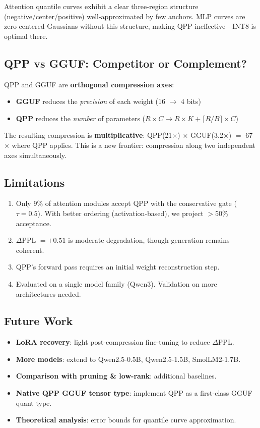 \documentclass[11pt,a4paper]{article}
\begin{document}
Attention quantile curves exhibit a clear three-region structure (negative/center/positive) well-approximated by few anchors. MLP curves are zero-centered Gaussians without this structure, making QPP ineffective---INT8 is optimal there.

\subsection{QPP vs GGUF: Competitor or Complement?}

QPP and GGUF are \textbf{orthogonal compression axes}:
\begin{itemize}
\item \textbf{GGUF} reduces the \textit{precision} of each weight (16 $\rightarrow$ 4 bits)
\item \textbf{QPP} reduces the \textit{number} of parameters ($R \times C \rightarrow R \times K + \lceil R/B \rceil \times C$)
\end{itemize}
The resulting compression is \textbf{multiplicative}: QPP(21$\times$) $\times$ GGUF(3.2$\times$) $=$ 67$\times$ where QPP applies. This is a new frontier: compression along two independent axes simultaneously.

\subsection{Limitations}

\begin{enumerate}
\item Only 9\% of attention modules accept QPP with the conservative gate ($\tau = 0.5$). With better ordering (activation-based), we project $>$50\% acceptance.
\item $\Delta$PPL $= +0.51$ is moderate degradation, though generation remains coherent.
\item QPP's forward pass requires an initial weight reconstruction step.
\item Evaluated on a single model family (Qwen3). Validation on more architectures needed.
\end{enumerate}

\subsection{Future Work}

\begin{itemize}
\item \textbf{LoRA recovery}: light post-compression fine-tuning to reduce $\Delta$PPL.
\item \textbf{More models}: extend to Qwen2.5-0.5B, Qwen2.5-1.5B, SmolLM2-1.7B.
\item \textbf{Comparison with pruning \& low-rank}: additional baselines.
\item \textbf{Native QPP GGUF tensor type}: implement QPP as a first-class GGUF quant type.
\item \textbf{Theoretical analysis}: error bounds for quantile curve approximation.
\end{itemize}
\end{document}
